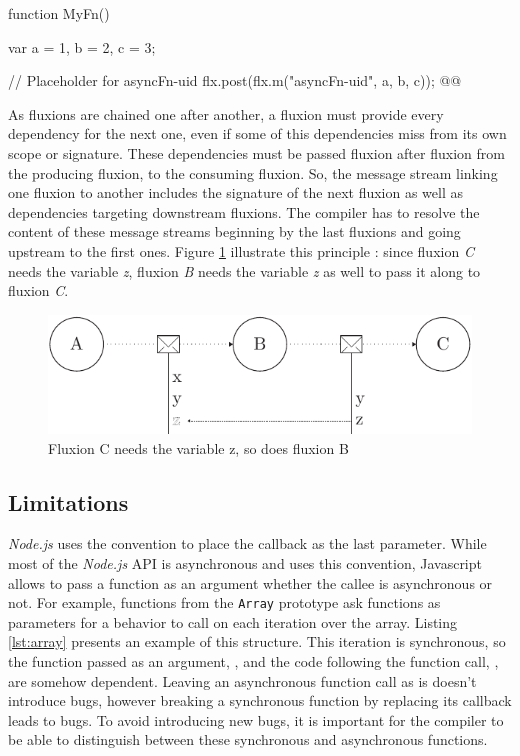 \begin{code}[Javascript, caption={Example of a placeholder function call},label={lst:placeholder}]
function MyFn() {
  var a = 1,
      b = 2,
      c = 3;

  // Placeholder for asyncFn-uid
  flx.post(flx.m("asyncFn-uid", {a, b, c})); @\label{lst:placeholdercall}@
}
\end{code}



As fluxions are chained one after another, a fluxion must provide every dependency for the next one, even if some of this dependencies miss from its own scope or signature.
These dependencies must be passed fluxion after fluxion from the producing fluxion, to the consuming fluxion.
So, the message stream linking one fluxion to another includes the signature of the next fluxion as well as dependencies targeting downstream fluxions.
The compiler has to resolve the content of these message streams beginning by the last fluxions and going upstream to the first ones.
Figure \ref{fig:streamline} illustrate this principle : since fluxion \textit{C} needs the variable \textit{z}, fluxion \textit{B} needs the variable \textit{z} as well to pass it along to fluxion \textit{C}.

\begin{figure}[h!]
  \includegraphics[width=\linewidth]{streamline.pdf}
  \caption{Fluxion C needs the variable z, so does fluxion B}
  \label{fig:streamline}
\end{figure}

\subsection{Limitations} \label{ss:Limitations}

\textit{Node.js} uses the convention to place the callback as the last parameter.
While most of the \textit{Node.js} API is asynchronous and uses this convention, Javascript allows to pass a function as an argument whether the callee is asynchronous or not.
For example, functions from the \texttt{Array} prototype ask functions as parameters for a behavior to call on each iteration over the array.
Listing \ref{lst:array} presents an example of this structure.
This iteration is synchronous, so the function passed as an argument, , and the code following the function call, , are somehow dependent.
Leaving an asynchronous function call as is doesn't introduce bugs, however breaking a synchronous function by replacing its callback leads to bugs.
To avoid introducing new bugs, it is important for the compiler to be able to distinguish between these synchronous and asynchronous functions.

